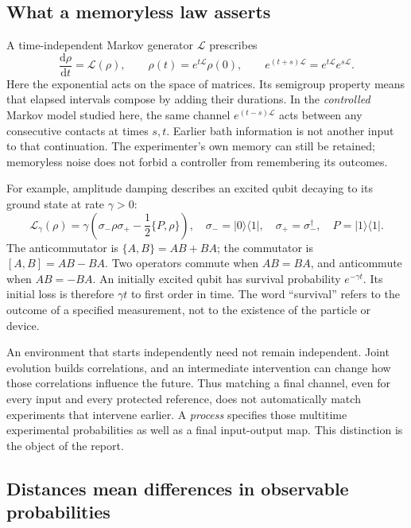 \documentclass[11pt,a4paper]{article}
\numberwithin{equation}{section}
\theoremstyle{remark}
\newcommand{\dd}{\mathrm d}
\begin{document}
\subsection{What a memoryless law asserts}

A time-independent Markov generator $\mathcal L$ prescribes
\begin{equation}
 \frac{\dd\rho}{\dd t}=\mathcal L(\rho),
 \qquad \rho(t)=e^{t\mathcal L}\rho(0),
 \qquad e^{(t+s)\mathcal L}=e^{t\mathcal L}e^{s\mathcal L}.
\end{equation}
Here the exponential acts on the space of matrices. Its semigroup property
means that elapsed intervals compose by adding their durations. In the
\emph{controlled} Markov model studied here, the same channel
$e^{(t-s)\mathcal L}$ acts between any consecutive contacts at times $s,t$.
Earlier bath information is not another input to that continuation. The
experimenter's own memory can still be retained; memoryless noise does not
forbid a controller from remembering its outcomes.

For example, amplitude damping describes an excited qubit decaying to its
ground state at rate $\gamma>0$:
\begin{equation}
 \mathcal L_\gamma(\rho)
 =\gamma\left(\sigma_-\rho\sigma_+-\frac12\{P,\rho\}\right),
 \quad \sigma_-=|0\rangle\langle1|,
 \quad \sigma_+=\sigma_-^\dagger,
 \quad P=|1\rangle\langle1|.
\end{equation}
The anticommutator is $\{A,B\}=AB+BA$; the commutator is $[A,B]=AB-BA$.
Two operators commute when $AB=BA$, and anticommute when $AB=-BA$.
An initially excited qubit has survival probability $e^{-\gamma t}$. Its
initial loss is therefore $\gamma t$ to first order in time. The word
``survival'' refers to the outcome of a specified measurement, not to the
existence of the particle or device.

An environment that starts independently need not remain independent.
Joint evolution builds correlations, and an intermediate intervention can
change how those correlations influence the future. Thus matching a final
channel, even for every input and every protected reference, does not
automatically match experiments that intervene earlier. A \emph{process}
specifies those multitime experimental probabilities as well as a final
input-output map. This distinction is the object of the report.

\subsection{Distances mean differences in observable probabilities}
\end{document}
